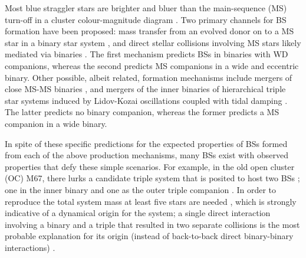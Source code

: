 \documentclass[twocolumn]{aastex62}
\begin{document}
Most blue straggler stars are brighter and bluer than the main-sequence
(MS) turn-off in a cluster colour-magnitude diagram
\citep[e.g.][]{1953AJ.....58...61S,1989AJ.....98..217L,2014ApJ...782...49S}.
Two primary channels for BS formation have been proposed: mass
transfer from an evolved donor on to a MS star in a binary star system
\citep[e.g.][]{1964MNRAS.128..147M,1997A&A...328..143P,2009Natur.457..288K,2011MNRAS.410.2370L,2011Natur.478..356G},
and direct stellar collisions involving MS stars likely mediated via
binaries
\citep[e.g.][]{1975AJ.....80..809H,1997A&A...328..130P,2007ApJ...661..210L,2013MNRAS.428..897L,2013MNRAS.429.1221H, 2019A&A...621L..10P}.
The first mechanism predicts BSs in binaries with WD companions,
whereas the second predicts MS companions in a wide and eccentric
binary.  Other possible, albeit related, formation mechanisms include
mergers of close MS-MS binaries \citep{2019A&A...621L..10P}, and
mergers of the inner binaries of hierarchical triple star systems
induced by Lidov-Kozai oscillations coupled with tidal damping
\citep[e.g.][]{2009ApJ...697.1048P}.  The latter predicts no binary companion, whereas the former predicts a MS companion in a wide binary.

In spite of these specific predictions for the expected properties of
BSs formed from each of the above production mechanisms, many BSs
exist with observed properties that defy these simple scenarios.  For
example, in the old open cluster (OC) M67, there lurks a candidate triple
system that is posited to host two BSs
\citep{2001A&A...375..375V,2003AJ....125..810S}; one in the inner binary and one as the outer triple companion \citep{2003AJ....125..810S,2001A&A...375..375V}.  
In order to reproduce the total system mass 
at least five stars are needed \citep{2011MNRAS.410.2370L}, which is strongly indicative of a
dynamical origin for the system; a single direct interaction
involving a binary and a triple that resulted in two separate
collisions is the most probable explanation for its origin
(instead of back-to-back direct binary-binary interactions)
\citep{2004MNRAS.350..615G,2011MNRAS.410.2370L}.  
\end{document}
